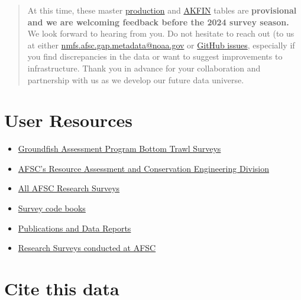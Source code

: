 \documentclass[
  letterpaper,
  oneside,
  open=any]{scrbook}
\providecommand{\tightlist}{%
  \setlength{\itemsep}{0pt}\setlength{\parskip}{0pt}}\usepackage{longtable,booktabs,array}
\begin{document}
\begin{quote}
At this time, these master
\href{https://afsc-gap-products.github.io/gap_products/content/product-intro.html}{production}
and
\href{https://afsc-gap-products.github.io/gap_products/content/akfin-intro.html}{AKFIN}
tables are \textbf{provisional and we are welcoming feedback before the
2024 survey season.} We look forward to hearing from you. Do not
hesitate to reach out (to us at either
\url{nmfs.afsc.gap.metadata@noaa.gov} or
\href{https://github.com/afsc-gap-products/gap_products/issues}{GitHub
issues}, especially if you find discrepancies in the data or want to
suggest improvements to infrastructure. Thank you in advance for your
collaboration and partnership with us as we develop our future data
universe.
\end{quote}

\hypertarget{user-resources}{%
\section*{User Resources}\label{user-resources}}


\begin{itemize}
\tightlist
\item
  \href{https://www.fisheries.noaa.gov/alaska/science-data/groundfish-assessment-program-bottom-trawl-surveys}{Groundfish
  Assessment Program Bottom Trawl Surveys}
\item
  \href{https://www.fisheries.noaa.gov/about/resource-assessment-and-conservation-engineering-division}{AFSC's
  Resource Assessment and Conservation Engineering Division}
\item
  \href{https://www.fisheries.noaa.gov/alaska/ecosystems/alaska-fish-research-surveys}{All
  AFSC Research Surveys}
\item
  \href{https://www.fisheries.noaa.gov/resource/document/groundfish-survey-species-code-manual-and-data-codes-manual}{Survey
  code books}
\item
  \href{https://repository.library.noaa.gov/}{Publications and Data
  Reports}
\item
  \href{https://www.fisheries.noaa.gov/alaska/ecosystems/alaska-fish-research-surveys}{Research
  Surveys conducted at AFSC}
\end{itemize}

\hypertarget{cite-this-data}{%
\section*{Cite this data}\label{cite-this-data}}
\end{document}
